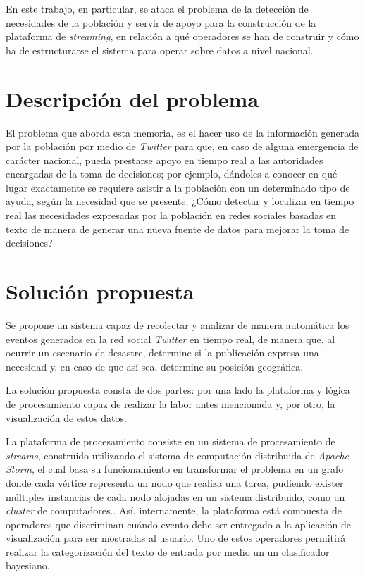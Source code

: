En este trabajo, en particular, se ataca el problema de la detección de necesidades de la población y servir de apoyo para la construcción de la plataforma de \textit{streaming}, en relación a qué operadores se han de construir y cómo ha de estructurarse el sistema para operar sobre datos a nivel nacional.

\section{Descripción del problema}
\label{intro:problema}

El problema que aborda esta memoria, es el hacer uso de la información generada por la población por medio de \textit{Twitter} para que, en caso de alguna emergencia de carácter nacional, pueda prestarse apoyo en tiempo real a las autoridades encargadas de la toma de decisiones; por ejemplo, dándoles a conocer en qué lugar exactamente se requiere asistir a la población con un determinado tipo de ayuda, según la necesidad que se presente. ¿Cómo detectar y localizar en tiempo real las necesidades expresadas por la población en redes sociales basadas en texto de manera de generar una nueva fuente de datos para mejorar la toma de decisiones?

\section{Solución propuesta}
\label{intro:solucion}

Se propone un sistema capaz de recolectar y analizar de manera automática los eventos generados en la red social \textit{Twitter} en tiempo real, de manera que, al ocurrir un escenario de desastre, determine si la publicación expresa una necesidad y, en caso de que así sea, determine su posición geográfica. 

La solución propuesta consta de dos partes: por una lado la plataforma y lógica de procesamiento capaz de realizar la labor antes mencionada y, por otro, la visualización de estos datos.

La plataforma de procesamiento consiste en un sistema de procesamiento de \textit{streams}, construido utilizando el sistema de computación distribuida de \textit{Apache Storm}, el cual basa su funcionamiento en transformar el problema en un grafo donde cada vértice representa un nodo que realiza una tarea, pudiendo exister múltiples instancias de cada nodo alojadas en un sistema distribuido, como un \textit{cluster} de computadores.. Así, internamente, la plataforma está compuesta de operadores que discriminan cuándo evento debe ser entregado a la aplicación de visualización para ser mostradas al usuario. Uno de estos operadores permitirá realizar la categorización del texto de entrada por medio un un clasificador bayesiano.

